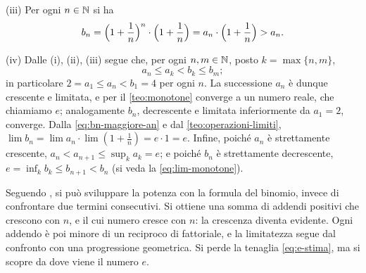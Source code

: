 \begin{dimostrazione}
(iii) Per ogni $n\in\mathbb{N}$ si ha
\begin{equation}\label{eq:bn-maggiore-an}
  b_{n}=\Bigl(1+\frac1n\Bigr)^{n}\cdot\Bigl(1+\frac1n\Bigr)=a_{n}\cdot\Bigl(1+\frac1n\Bigr)>a_{n}.
\end{equation}

(iv) Dalle (i), (ii), (iii) segue che, per ogni $n,m\in\mathbb{N}$, posto $k=\max\{n,m\}$,
\begin{equation}\label{eq:an-minore-bm}
  a_{n}\le a_{k}<b_{k}\le b_{m};
\end{equation}
in particolare $2=a_{1}\le a_{n}<b_{1}=4$ per ogni $n$. La successione $a_{n}$ è dunque
crescente e limitata, e per il \cref{teo:monotone} converge a un numero reale, che
chiamiamo $e$; analogamente $b_{n}$, decrescente e limitata inferiormente da $a_{1}=2$,
converge. Dalla \eqref{eq:bn-maggiore-an} e dal \cref{teo:operazioni-limiti},
$\lim b_{n}=\lim a_{n}\cdot\lim(1+\frac1n)=e\cdot1=e$. Infine, poiché $a_{n}$ è strettamente
crescente, $a_{n}<a_{n+1}\le\sup_{k}a_{k}=e$; e poiché $b_{n}$ è strettamente
decrescente, $e=\inf_{k}b_{k}\le b_{n+1}<b_{n}$ (si veda la \eqref{eq:lim-monotone}).
\end{dimostrazione}

\begin{strategia}
Seguendo \cite{giusti}, si può sviluppare la potenza con la formula del binomio, invece di
confrontare due termini consecutivi. Si ottiene una somma di addendi positivi che
crescono con $n$, e il cui numero cresce con $n$: la crescenza diventa evidente. Ogni
addendo è poi minore di un reciproco di fattoriale, e la limitatezza segue dal confronto
con una progressione geometrica. Si perde la tenaglia \eqref{eq:e-stima}, ma si scopre da
dove viene il numero $e$.
\end{strategia}

